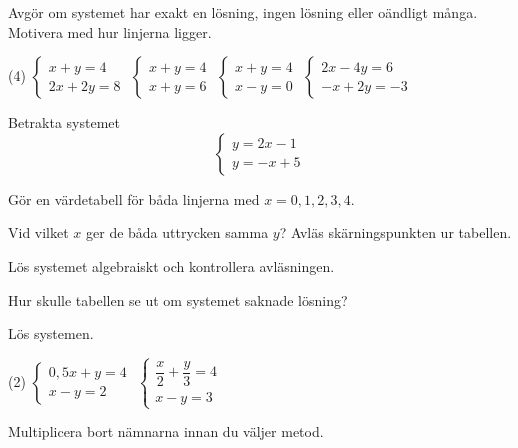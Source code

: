 Avgör om systemet har exakt en lösning, ingen lösning eller oändligt många. Motivera med hur
linjerna ligger.
\begin{delar}[column-sep=0.4em](4)
  \task $\begin{cases} x + y = 4 \\ 2x + 2y = 8 \end{cases}$
  \task $\begin{cases} x + y = 4 \\ x + y = 6 \end{cases}$
  \task $\begin{cases} x + y = 4 \\ x - y = 0 \end{cases}$
  \task $\begin{cases} 2x - 4y = 6 \\ -x + 2y = -3 \end{cases}$
\end{delar}

Betrakta systemet
\[
  \begin{cases}
    y = 2x - 1 \\
    y = -x + 5
  \end{cases}
\]
\begin{parts}
  \item Gör en värdetabell för båda linjerna med $x = 0, 1, 2, 3, 4$.
  \item Vid vilket $x$ ger de båda uttrycken samma $y$? Avläs skärningspunkten ur tabellen.
  \item Lös systemet algebraiskt och kontrollera avläsningen.
  \item Hur skulle tabellen se ut om systemet saknade lösning?
\end{parts}

Lös systemen.
\begin{delar}(2)
  \task $\begin{cases} 0{,}5x + y = 4 \\ x - y = 2 \end{cases}$
  \task $\begin{cases} \dfrac{x}{2} + \dfrac{y}{3} = 4 \\ x - y = 3 \end{cases}$
\end{delar}

\begin{aside}
\note[Tips] Multiplicera bort nämnarna innan du väljer metod.
\end{aside}

